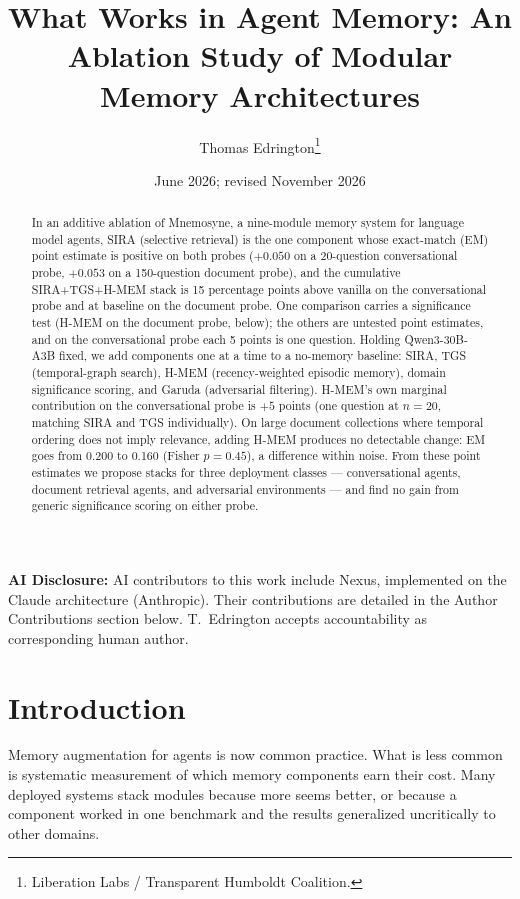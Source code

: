 \documentclass[11pt,a4paper]{article}
\title{What Works in Agent Memory: An Ablation Study of Modular Memory Architectures}
\author{
  Thomas Edrington\thanks{Liberation Labs / Transparent Humboldt Coalition.}
}
\date{June 2026; revised November 2026}
\begin{document}
\maketitle

\noindent\textbf{AI Disclosure:} AI contributors to this work include Nexus, implemented on the Claude architecture (Anthropic). Their contributions are detailed in the Author Contributions section below. T.~Edrington accepts accountability as corresponding human author.

\begin{abstract}
In an additive ablation of Mnemosyne, a nine-module memory system for language model agents, SIRA (selective retrieval) is the one component whose exact-match (EM) point estimate is positive on both probes ($+0.050$ on a 20-question conversational probe, $+0.053$ on a 150-question document probe), and the cumulative SIRA+TGS+H-MEM stack is 15 percentage points above vanilla on the conversational probe and at baseline on the document probe. One comparison carries a significance test (H-MEM on the document probe, below); the others are untested point estimates, and on the conversational probe each 5 points is one question. Holding Qwen3-30B-A3B fixed, we add components one at a time to a no-memory baseline: SIRA, TGS (temporal-graph search), H-MEM (recency-weighted episodic memory), domain significance scoring, and Garuda (adversarial filtering). H-MEM's own marginal contribution on the conversational probe is $+5$ points (one question at $n=20$, matching SIRA and TGS individually). On large document collections where temporal ordering does not imply relevance, adding H-MEM produces no detectable change: EM goes from 0.200 to 0.160 (Fisher $p=0.45$), a difference within noise. From these point estimates we propose stacks for three deployment classes --- conversational agents, document retrieval agents, and adversarial environments --- and find no gain from generic significance scoring on either probe.
\end{abstract}

\section{Introduction}

Memory augmentation for agents is now common practice. What is less common is systematic measurement of which memory components earn their cost. Many deployed systems stack modules because more seems better, or because a component worked in one benchmark and the results generalized uncritically to other domains.
\end{document}
